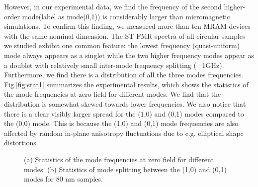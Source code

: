 However, in our experimental data, we find the frequency of the second higher-order mode(label as mode(0,1)) is considerably larger than micromagnetic simulations. To  confirm this finding, we measured more than ten MRAM devices with the same nominal dimension. The ST-FMR spectra of all circular samples we studied exhibit one common feature: the lowest frequency (quasi-uniform) mode always appears as a singlet while the two higher frequency modes appear as a doublet with relatively small inter-mode frequency splitting (~ 1GHz). Furthermore, we find there is a distribution of all the three modes frequencies. Fig.\ref{fig:stat1} summarizes the experimental results, which shows the statistics of the mode frequencies at zero field for different modes. We find that the distribution is somewhat skewed towards lower frequencies. We also notice that there is a clear visibly larger spread for the (1,0) and (0,1) modes compared to the (0,0) mode. This is because the (1,0) and (0,1) mode frequencies are also affected by random in-plane anisotropy fluctuations due to e.g. elliptical shape distortions.


\begin{figure}[h!]
\centering     
{}
\caption{(a) Statistics of the mode frequencies at zero field for different modes. (b) Statistics of mode splitting between the (1,0) and (0,1) modes for 80 nm samples.
}
\end{figure}


